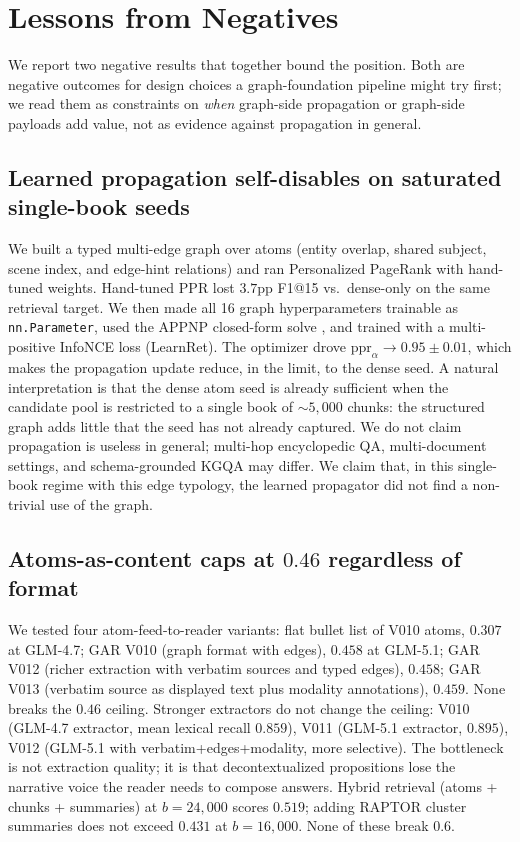 \documentclass{article}
\theoremstyle{plain}
\theoremstyle{definition}
\theoremstyle{remark}
\begin{document}
\section{Lessons from Negatives}
\label{sec:negatives}

We report two negative results that together bound the position. Both are
negative outcomes for design choices a graph-foundation pipeline might try
first; we read them as constraints on \emph{when} graph-side propagation or
graph-side payloads add value, not as evidence against propagation in
general.

\subsection{Learned propagation self-disables on saturated single-book seeds}
We built a typed multi-edge graph over atoms (entity overlap, shared subject,
scene index, and edge-hint relations) and ran Personalized PageRank with
hand-tuned weights. Hand-tuned PPR lost $3.7$pp F1@15 vs.\ dense-only on the
same retrieval target. We then made all 16 graph hyperparameters trainable
as \texttt{nn.Parameter}, used the APPNP closed-form solve
\citep{klein2024appnp}, and trained with a multi-positive InfoNCE loss
(LearnRet). The optimizer drove $\mathrm{ppr}_\alpha\!\to\!0.95\!\pm\!0.01$,
which makes the propagation update reduce, in the limit, to the dense seed.
A natural interpretation is that the dense atom seed is already sufficient
when the candidate pool is restricted to a single book of $\sim$$5{,}000$
chunks: the structured graph adds little that the seed has not already
captured. We do not claim propagation is useless in general; multi-hop
encyclopedic QA, multi-document settings, and schema-grounded KGQA may
differ. We claim that, in this single-book regime with this edge typology,
the learned propagator did not find a non-trivial use of the graph.

\subsection{Atoms-as-content caps at $0.46$ regardless of format}
We tested four atom-feed-to-reader variants:
flat bullet list of V010 atoms, $0.307$ at GLM-4.7;
GAR V010 (graph format with edges), $0.458$ at GLM-5.1;
GAR V012 (richer extraction with verbatim sources and typed edges), $0.458$;
GAR V013 (verbatim source as displayed text plus modality annotations),
$0.459$. None breaks the $0.46$ ceiling. Stronger extractors do not change the
ceiling: V010 (GLM-4.7 extractor, mean lexical recall $0.859$), V011 (GLM-5.1
extractor, $0.895$), V012 (GLM-5.1 with verbatim+edges+modality, more
selective). The bottleneck is not extraction quality; it is that decontextualized
propositions lose the narrative voice the reader needs to compose answers.
Hybrid retrieval (atoms + chunks + summaries) at $b=24{,}000$ scores $0.519$;
adding RAPTOR cluster summaries does not exceed $0.431$ at $b=16{,}000$. None
of these break $0.6$.
\end{document}
